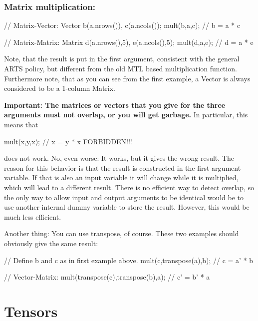 \subsubsection{Matrix multiplication:}
\begin{code}
// Matrix-Vector:
Vector b(a.nrows()), c(a.ncols());
mult(b,a,c);                           // b = a * c

// Matrix-Matrix:
Matrix d(a.nrows(),5), e(a.ncols(),5);
mult(d,a,e);                           // d = a * e
\end{code}

Note, that the result is put in the first argument, consistent with
the general ARTS policy, but different from the old MTL based
multiplication function. Furthermore note, that as you can see from
the first example, a Vector is always considered to be a 1-column
Matrix.

\textbf{Important: The matrices or vectors that you give for the three
arguments must not overlap, or you will get garbage.} In particular,
this means that
\begin{code}
mult(x,y,x);            // x = y * x FORBIDDEN!!!
\end{code}
does not work. No, even worse: It works, but it gives the wrong
result.  The reason for this behavior is that the result is
constructed in the first argument variable. If that is also an input
variable it will change while it is multiplied, which will lead to a
different result.  There is no efficient way to detect overlap, so the
only way to allow input and output arguments to be identical would be
to use another internal dummy variable to store the result. However,
this would be much less efficient.

Another thing: You can use transpose, of course. These two examples
should obviously give the same result:

\begin{code}
// Define b and c as in first example above.
mult(c,transpose(a),b);                      // c = a' * b

// Vector-Matrix:
mult(transpose(c),transpose(b),a);           // c' = b' * a
\end{code}


\section{Tensors}
\label{sec:matpack:tensors}

